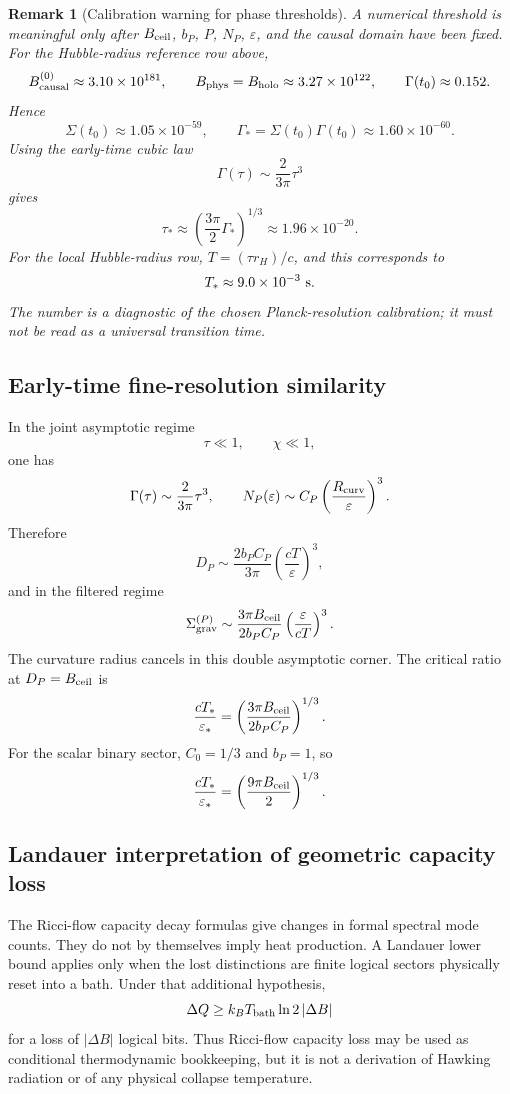 \documentclass[11pt,a4paper]{article}
\newtheorem{remark}[theorem]{Remark}
\begin{document}
\begin{remark}[Calibration warning for phase thresholds]
A numerical threshold is meaningful only after $B_{\rm ceil}$, $b_P$, $P$, $N_P$, $\varepsilon$, and the causal domain have been fixed.  For the Hubble-radius reference row above,
\[
B_{\rm causal}^{(0)}\approx3.10\times10^{181},\qquad
B_{\rm phys}=B_{\rm holo}\approx3.27\times10^{122},\qquad
\Gamma(t_0)\approx0.152.
\]
Hence
\[
\Sigma(t_0)\approx1.05\times10^{-59},
\qquad
\Gamma_*=\Sigma(t_0)\Gamma(t_0)\approx1.60\times10^{-60}.
\]
Using the early-time cubic law
\[
\Gamma(\tau)\sim\frac{2}{3\pi}\tau^3
\]
gives
\[
\tau_*\approx
\left(\frac{3\pi}{2}\Gamma_*\right)^{1/3}
\approx1.96\times10^{-20}.
\]
For the local Hubble-radius row, $T=(\tau r_H)/c$, and this corresponds to
\[
T_*\approx9.0\times10^{-3}\ {\rm s}.
\]
The number is a diagnostic of the chosen Planck-resolution calibration; it must not be read as a universal transition time.
\end{remark}

\subsection{Early-time fine-resolution similarity}

In the joint asymptotic regime
\[
\tau\ll1,\qquad \chi\ll1,
\]
one has
\[
\Gamma(\tau)\sim\frac{2}{3\pi}\tau^3,
\qquad
N_P(\varepsilon)\sim C_P\left(\frac{R_{\rm curv}}{\varepsilon}\right)^3.
\]
Therefore
\[
D_P\sim
\frac{2b_PC_P}{3\pi}
\left(\frac{cT}{\varepsilon}\right)^3,
\]
and in the filtered regime
\[
\Sigma_{\rm grav}^{(P)}
\sim
\frac{3\pi B_{\rm ceil}}{2b_PC_P}
\left(\frac{\varepsilon}{cT}\right)^3.
\]
The curvature radius cancels in this double asymptotic corner.  The critical ratio at $D_P=B_{\rm ceil}$ is
\[
\frac{cT_*}{\varepsilon_*}
=
\left(
\frac{3\pi B_{\rm ceil}}{2b_PC_P}
\right)^{1/3}.
\]
For the scalar binary sector, $C_0=1/3$ and $b_P=1$, so
\[
\frac{cT_*}{\varepsilon_*}
=
\left(
\frac{9\pi B_{\rm ceil}}{2}
\right)^{1/3}.
\]

\subsection{Landauer interpretation of geometric capacity loss}

The Ricci-flow capacity decay formulas give changes in formal spectral mode counts.  They do not by themselves imply heat production.  A Landauer lower bound applies only when the lost distinctions are finite logical sectors physically reset into a bath.  Under that additional hypothesis,
\[
\Delta Q\ge k_BT_{\rm bath}\ln2\,|\Delta B|
\]
for a loss of $|\Delta B|$ logical bits.  Thus Ricci-flow capacity loss may be used as conditional thermodynamic bookkeeping, but it is not a derivation of Hawking radiation or of any physical collapse temperature.
\end{document}

